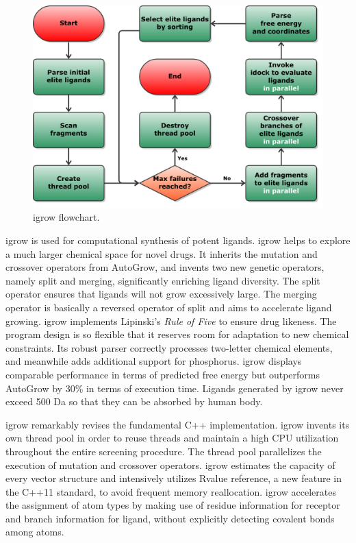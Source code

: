 \begin{figure}
\centering
\includegraphics[width=\textwidth]{igrow/Flowchart.pdf}
\caption{igrow flowchart.}
\label{igrow:Flowchart}
\end{figure}

igrow is used for computational synthesis of potent ligands. igrow helps to explore a much larger chemical space for novel drugs. It inherits the mutation and crossover operators from AutoGrow, and invents two new genetic operators, namely split and merging, significantly enriching ligand diversity. The split operator ensures that ligands will not grow excessively large. The merging operator is basically a reversed operator of split and aims to accelerate ligand growing. igrow implements Lipinski's \textit{Rule of Five} \citep{168} to ensure drug likeness. The program design is so flexible that it reserves room for adaptation to new chemical constraints. Its robust parser correctly processes two-letter chemical elements, and meanwhile adds additional support for phosphorus. igrow displays comparable performance in terms of predicted free energy but outperforms AutoGrow by 30\% in terms of execution time. Ligands generated by igrow never exceed 500 Da so that they can be absorbed by human body. 

igrow remarkably revises the fundamental C++ implementation. igrow invents its own thread pool in order to reuse threads and maintain a high CPU utilization throughout the entire screening procedure. The thread pool parallelizes the execution of mutation and crossover operators. igrow estimates the capacity of every vector structure and intensively utilizes Rvalue reference, a new feature in the C++11 standard, to avoid frequent memory reallocation. igrow accelerates the assignment of atom types by making use of residue information for receptor and branch information for ligand, without explicitly detecting covalent bonds among atoms.

